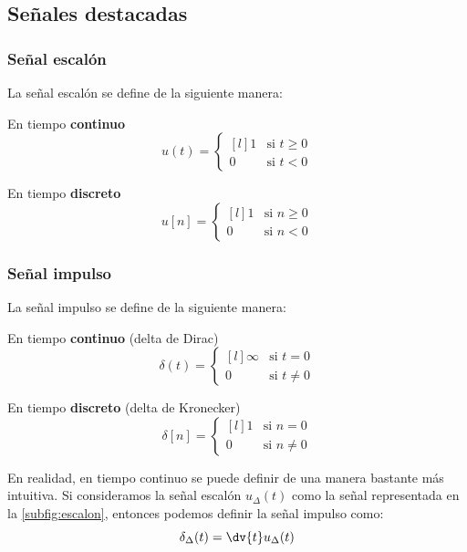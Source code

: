 \documentclass[a4paper]{book}
\begin{document}
\subsection{Señales destacadas}
\subsubsection{Señal escalón}
La señal escalón se define de la siguiente manera:
\begin{multicols}{2}
	\centering
	En tiempo \textbf{continuo}
	\[u(t) = \left\{ \begin{matrix*}[l]
			1 & \text{si }t\geq 0 \\[5pt]
			0 & \text{si }t <0
		\end{matrix*} \right.\]

	En tiempo \textbf{discreto}
	\[u[n] = \left\{ \begin{matrix*}[l]
			1 & \text{si }n\geq 0 \\[5pt]
			0 & \text{si }n <0
		\end{matrix*} \right.\]
\end{multicols}

\subsubsection{Señal impulso}
La señal impulso se define de la siguiente manera:
\begin{multicols}{2}
	\centering
	En tiempo \textbf{continuo} (delta de Dirac)
	\[\delta (t) = \left\{ \begin{matrix*}[l]
			\infty & \text{si }t = 0 \\[5pt]
			0 & \text{si }t \not = 0
		\end{matrix*} \right.\]

	En tiempo \textbf{discreto} (delta de Kronecker)
	\[\delta [n] = \left\{ \begin{matrix*}[l]
			1 & \text{si }n = 0 \\[5pt]
			0 & \text{si }n \not = 0
		\end{matrix*} \right.\]
\end{multicols}

En realidad, en tiempo continuo se puede definir de una manera bastante más intuitiva. Si consideramos la señal escalón $u_\Delta (t)$ como la señal representada en la \autoref{subfig:escalon}, entonces podemos definir la señal impulso como: \[\delta _\Delta (t) = \dv{t} u_\Delta (t)\]
\end{document}
